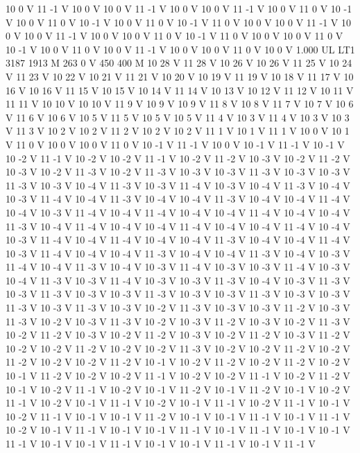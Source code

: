 {10 0 V
11 -1 V
10 0 V
10 0 V
11 -1 V
10 0 V
10 0 V
11 -1 V
10 0 V
11 0 V
10 -1 V
10 0 V
11 0 V
10 -1 V
10 0 V
11 0 V
10 -1 V
11 0 V
10 0 V
10 0 V
11 -1 V
10 0 V
10 0 V
11 -1 V
10 0 V
10 0 V
11 0 V
10 -1 V
11 0 V
10 0 V
10 0 V
11 0 V
10 -1 V
10 0 V
11 0 V
10 0 V
11 -1 V
10 0 V
10 0 V
11 0 V
10 0 V
1.000 UL
LT1
3187 1913 M
263 0 V
450 400 M
10 28 V
11 28 V
10 26 V
10 26 V
11 25 V
10 24 V
11 23 V
10 22 V
10 21 V
11 21 V
10 20 V
10 19 V
11 19 V
10 18 V
11 17 V
10 16 V
10 16 V
11 15 V
10 15 V
10 14 V
11 14 V
10 13 V
10 12 V
11 12 V
10 11 V
11 11 V
10 10 V
10 10 V
11 9 V
10 9 V
10 9 V
11 8 V
10 8 V
11 7 V
10 7 V
10 6 V
11 6 V
10 6 V
10 5 V
11 5 V
10 5 V
10 5 V
11 4 V
10 3 V
11 4 V
10 3 V
10 3 V
11 3 V
10 2 V
10 2 V
11 2 V
10 2 V
10 2 V
11 1 V
10 1 V
11 1 V
10 0 V
10 1 V
11 0 V
10 0 V
10 0 V
11 0 V
10 -1 V
11 -1 V
10 0 V
10 -1 V
11 -1 V
10 -1 V
10 -2 V
11 -1 V
10 -2 V
10 -2 V
11 -1 V
10 -2 V
11 -2 V
10 -3 V
10 -2 V
11 -2 V
10 -3 V
10 -2 V
11 -3 V
10 -2 V
11 -3 V
10 -3 V
10 -3 V
11 -3 V
10 -3 V
10 -3 V
11 -3 V
10 -3 V
10 -4 V
11 -3 V
10 -3 V
11 -4 V
10 -3 V
10 -4 V
11 -3 V
10 -4 V
10 -3 V
11 -4 V
10 -4 V
11 -3 V
10 -4 V
10 -4 V
11 -3 V
10 -4 V
10 -4 V
11 -4 V
10 -4 V
10 -3 V
11 -4 V
10 -4 V
11 -4 V
10 -4 V
10 -4 V
11 -4 V
10 -4 V
10 -4 V
11 -3 V
10 -4 V
11 -4 V
10 -4 V
10 -4 V
11 -4 V
10 -4 V
10 -4 V
11 -4 V
10 -4 V
10 -3 V
11 -4 V
10 -4 V
11 -4 V
10 -4 V
10 -4 V
11 -3 V
10 -4 V
10 -4 V
11 -4 V
10 -3 V
11 -4 V
10 -4 V
10 -4 V
11 -3 V
10 -4 V
10 -4 V
11 -3 V
10 -4 V
10 -3 V
11 -4 V
10 -4 V
11 -3 V
10 -4 V
10 -3 V
11 -4 V
10 -3 V
10 -3 V
11 -4 V
10 -3 V
10 -4 V
11 -3 V
10 -3 V
11 -4 V
10 -3 V
10 -3 V
11 -3 V
10 -4 V
10 -3 V
11 -3 V
10 -3 V
11 -3 V
10 -3 V
10 -3 V
11 -3 V
10 -3 V
10 -3 V
11 -3 V
10 -3 V
10 -3 V
11 -3 V
10 -3 V
11 -3 V
10 -3 V
10 -2 V
11 -3 V
10 -3 V
10 -3 V
11 -2 V
10 -3 V
11 -3 V
10 -2 V
10 -3 V
11 -3 V
10 -2 V
10 -3 V
11 -2 V
10 -3 V
10 -2 V
11 -3 V
10 -2 V
11 -2 V
10 -3 V
10 -2 V
11 -2 V
10 -3 V
10 -2 V
11 -2 V
10 -3 V
11 -2 V
10 -2 V
10 -2 V
11 -2 V
10 -2 V
10 -2 V
11 -3 V
10 -2 V
10 -2 V
11 -2 V
10 -2 V
11 -2 V
10 -2 V
10 -2 V
11 -2 V
10 -1 V
10 -2 V
11 -2 V
10 -2 V
11 -2 V
10 -2 V
10 -1 V
11 -2 V
10 -2 V
10 -2 V
11 -1 V
10 -2 V
10 -2 V
11 -1 V
10 -2 V
11 -2 V
10 -1 V
10 -2 V
11 -1 V
10 -2 V
10 -1 V
11 -2 V
10 -1 V
11 -2 V
10 -1 V
10 -2 V
11 -1 V
10 -2 V
10 -1 V
11 -1 V
10 -2 V
10 -1 V
11 -1 V
10 -2 V
11 -1 V
10 -1 V
10 -2 V
11 -1 V
10 -1 V
10 -1 V
11 -2 V
10 -1 V
10 -1 V
11 -1 V
10 -1 V
11 -1 V
10 -2 V
10 -1 V
11 -1 V
10 -1 V
10 -1 V
11 -1 V
10 -1 V
11 -1 V
10 -1 V
10 -1 V
11 -1 V
10 -1 V
10 -1 V
11 -1 V
10 -1 V
10 -1 V
11 -1 V
10 -1 V
11 -1 V
}
